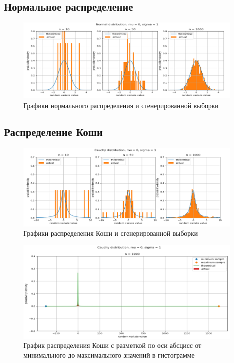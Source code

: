 \documentclass[12pt,a4paper]{article}
\begin{document}
	\subsection{Нормальное распределение}
		\begin{figure}[h]
			\centering
			\includegraphics[width=\linewidth]{MS1res/normal.png}
			\caption{Графики нормального распределения и сгенерированной выборки}
		\end{figure}
	\subsection{Распределение Коши}
		\begin{figure}[h]
			\centering
			\includegraphics[width=\linewidth]{MS1res/cauchy.png}
			\caption{Графики распределения Коши и сгенерированной выборки}
		\end{figure}
		\begin{figure}[h]
			\centering
			\includegraphics[width=\linewidth]{MS1res/cauchy_n_1000.png}
			\caption{\centering График распределения Коши с разметкой по оси абсцисс от минимального до максимального значений в гистограмме}
		\end{figure}
\end{document}

